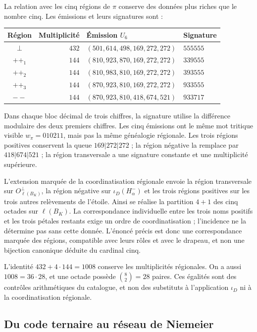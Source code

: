 La relation avec les cinq régions de $\pi$ conserve des données plus riches
que le nombre cinq. Les émissions et leurs signatures sont :
\begin{center}
\small
\begin{tabular}{@{}crll@{}}
\toprule
Région & Multiplicité & Émission $U_6$ & Signature \\
\midrule
$\perp$ & $432$ & $(501,614,498,169,272,272)$ & $555555$ \\
$++_1$ & $144$ & $(810,923,870,169,272,272)$ & $339555$ \\
$++_2$ & $144$ & $(810,983,810,169,272,272)$ & $393555$ \\
$++_3$ & $144$ & $(870,923,810,169,272,272)$ & $933555$ \\
$--$ & $144$ & $(870,923,810,418,674,521)$ & $933717$ \\
\bottomrule
\end{tabular}
\end{center}
Dans chaque bloc décimal de trois chiffres, la signature utilise la différence
modulaire des deux premiers chiffres. Les cinq émissions ont le
même mot tritique visible $w_\pi=010211$, mais pas la même
généalogie régionale. Les trois régions positives conservent la queue
$169|272|272$ ; la région négative la remplace par $418|674|521$ ;
la région transversale a une signature constante et une multiplicité supérieure.

L'extension marquée de la coordinatisation régionale envoie la région transversale
sur $O_{\ell(B_K)}^\perp$, la région négative sur $\iota_D(H^-_\alpha)$ et les
trois régions positives sur les trois autres relèvements de l'étoile. Ainsi se
réalise la partition $4+1$ des cinq octades sur $\ell(B_K)$.
La correspondance individuelle entre les trois noms positifs et
les trois pétales restants exige un ordre de coordinatisation ; l'incidence ne la détermine
pas sans cette donnée. L'énoncé précis est donc une
correspondance marquée des régions, compatible avec leurs rôles et avec
le drapeau, et non une bijection canonique déduite du cardinal cinq.

L'identité $432+4\cdot144=1008$ conserve les multiplicités
régionales. On a aussi $1008=36\cdot28$, et une octade possède
$\binom82=28$ paires. Ces égalités sont des contrôles arithmétiques du
catalogue, et non des substituts à l'application $\iota_D$ ni à la coordinatisation régionale.



\subsection{Du code ternaire au réseau de Niemeier}
\label{exc:niemeier}

